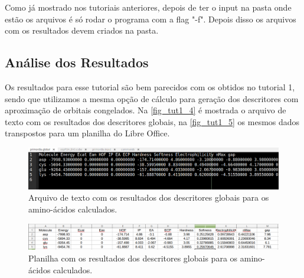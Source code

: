 \documentclass[a4paper,11pt]{refart}
\begin{document}
Como já mostrado nos tutoriais anteriores, depois de ter o input na pasta onde estão os arquivos é só rodar o programa com a flag "-f". Depois disso os arquivos com os resultados devem criados na pasta. 

\subsection{Análise dos Resultados}

Os resultados para esse tutorial são bem parecidos com os obtidos no tutorial 1, sendo que utilizamos a mesma opção de cálculo para geração dos descritores com aproximação de orbitais congelados. Na \autoref{fig_tut1_4} é mostrada o arquivo de texto com os resultados dos descritores globais, na \autoref{fig_tut1_5} os mesmos dados transpostos para um planilha do Libre Office.  

\hspace*{-\leftmarginwidth}
\begin{minipage}{\fullwidth}
	\begin{figure}[H]
		\begin{center}
			\includegraphics[width=6in]{images/tut4_img3}
			\caption{Arquivo de texto com os resultados dos  descritores globais para os amino-ácidos calculados.}
			\label{fig_tut4_1}
		\end{center}
	\end{figure}
\end{minipage}

\hspace*{-\leftmarginwidth}
\begin{minipage}{\fullwidth}
	\begin{figure}[H]
		\begin{center}
			\includegraphics[width=6in]{images/tut4_img4}
			\caption{Planilha com os resultados dos descritores globais para os amino-ácidos calculados.}
			\label{fig_tut4_2}
		\end{center}
	\end{figure}
\end{minipage}
\end{document}

